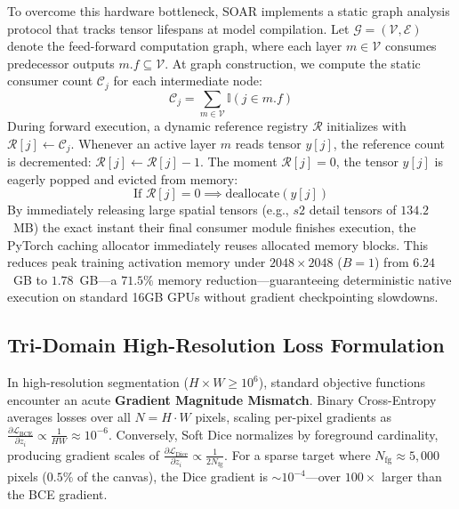 \documentclass[11pt,a4paper]{article}
\begin{document}
To overcome this hardware bottleneck, SOAR implements a static graph analysis protocol that tracks tensor lifespans at model compilation. Let $\mathcal{G} = (\mathcal{V}, \mathcal{E})$ denote the feed-forward computation graph, where each layer $m \in \mathcal{V}$ consumes predecessor outputs $m.f \subseteq \mathcal{V}$. At graph construction, we compute the static consumer count $\mathcal{C}_j$ for each intermediate node:
\begin{equation}
\mathcal{C}_j = \sum_{m \in \mathcal{V}} \mathbb{I}(j \in m.f)
\end{equation}
During forward execution, a dynamic reference registry $\mathcal{R}$ initializes with $\mathcal{R}[j] \leftarrow \mathcal{C}_j$. Whenever an active layer $m$ reads tensor $y[j]$, the reference count is decremented: $\mathcal{R}[j] \leftarrow \mathcal{R}[j] - 1$. The moment $\mathcal{R}[j] = 0$, the tensor $y[j]$ is eagerly popped and evicted from memory:
\begin{equation}
\text{If } \mathcal{R}[j] = 0 \implies \text{deallocate}(y[j])
\end{equation}
By immediately releasing large spatial tensors (e.g., $s2$ detail tensors of $134.2$~MB) the exact instant their final consumer module finishes execution, the PyTorch caching allocator immediately reuses allocated memory blocks. This reduces peak training activation memory under $2048\times 2048$ ($B=1$) from $6.24$~GB to $1.78$~GB---a $\mathbf{71.5\%}$ memory reduction---guaranteeing deterministic native execution on standard 16GB GPUs without gradient checkpointing slowdowns.

\subsection{Tri-Domain High-Resolution Loss Formulation}
In high-resolution segmentation ($H \times W \ge 10^6$), standard objective functions encounter an acute \textbf{Gradient Magnitude Mismatch}. Binary Cross-Entropy averages losses over all $N = H \cdot W$ pixels, scaling per-pixel gradients as $\frac{\partial \mathcal{L}_{\text{BCE}}}{\partial z_i} \propto \frac{1}{HW} \approx 10^{-6}$. Conversely, Soft Dice normalizes by foreground cardinality, producing gradient scales of $\frac{\partial \mathcal{L}_{\text{Dice}}}{\partial z_i} \propto \frac{1}{2 N_{\text{fg}}}$. For a sparse target where $N_{\text{fg}} \approx 5{,}000$ pixels ($0.5\%$ of the canvas), the Dice gradient is $\sim 10^{-4}$---over $100\times$ larger than the BCE gradient. 
\end{document}
